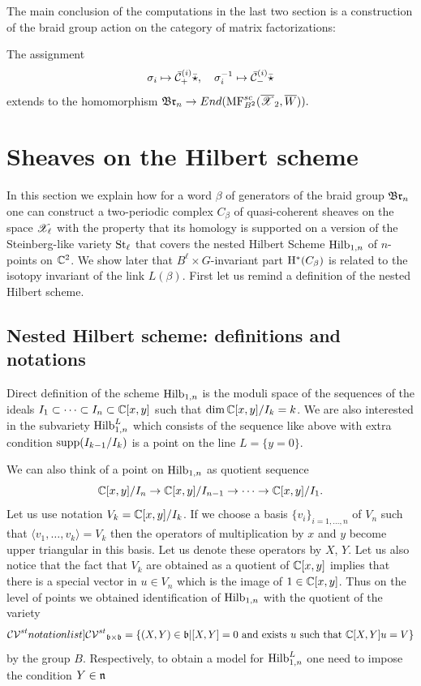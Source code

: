The main conclusion of the computations in the last two section is a construction of the braid group  action on the category of matrix factorizations:
\begin{corollary} The assignment
  \[\sigma_i\mapsto \bar{\mathcal{C}}^{(i)}_+\bar{\star},\quad \sigma_{i}^{-1}\mapsto \bar{\mathcal{C}}^{(i)}_-\bar{\star} \]
  extends to the homomorphism \(\mathfrak{Br}_n\to End(\mathrm{MF}^{sc}_{B^2}(\overline{\mathscr{X}}_2,\overline{W})).\)
\end{corollary}


\section{Sheaves on the Hilbert scheme}\label{sec: link inv}
In this section we explain how for a word $\beta$ of generators of the braid group $ \mathfrak{Br}_n$ one can construct a two-periodic complex $C_\beta$ of quasi-coherent sheaves on the space $\mathscr{X}_\ell$ with the property that
its homology is supported on
a version of the Steinberg-like
variety $\mathrm{St}_\ell$ that covers  the nested Hilbert Scheme $\mathrm{Hilb}_{1,n}$ of $n$-points on $\mathbb{C}^2$.
We show later  that $B^\ell\times G$-invariant part $\mathrm{H}^{*}(C_\beta)$ is related to the isotopy   invariant of the link $L(\beta)$. First let us remind a definition of the nested Hilbert scheme.

\subsection{Nested Hilbert scheme: definitions and notations}\label{ssec: NHilb defs} Direct definition of the scheme $\mathrm{Hilb}_{1,n}$ is the moduli space of the sequences of the ideals $I_1\subset\dots\subset I_n\subset \mathbb{C}[x,y]$ such that $\dim \mathbb{C}[x,y]/I_k=k$.
We are also interested in the subvariety $\mathrm{Hilb}_{1,n}^L$ which consists of the sequence like above with extra condition $\mathrm{supp}(I_{k-1}/I_k)$ is a point on the line $L=\{ y=0\}$.


We can also think of a point on $\mathrm{Hilb}_{1,n}$ as  quotient sequence \[\mathbb{C}[x,y]/I_n\to\mathbb{C}[x,y]/I_{n-1}\to\dots\to \mathbb{C}[x,y]/I_1.\]
Let us use notation $V_k=\mathbb{C}[x,y]/I_k$.
If we choose a basis $\{v_i\}_{i=1,\dots,n}$ of $V_n$ such that $\langle v_1,\dots,v_k\rangle=V_k$ then the operators of multiplication by $x$ and $y$ become upper triangular in this basis.
Let us denote these operators by $X$, $Y$. Let us also notice that the fact that $V_k$ are obtained as a quotient of $\mathbb{C}[x,y]$ implies that there is a special vector in $u\in V_n$ which is the image of
$1\in \mathbb{C}[x,y]$. Thus on the level of points we obtained identification of $\mathrm{Hilb}_{1,n}$ with the quotient of the variety
$$\SymbolPrint{ \mathcal{CV}^{st}}_{\frb\times\frb}=\{(X,Y)\in \frb| [X,Y]=0 \mbox{ and exists } u \mbox{ such that } \CC[X,Y] u=V\}$$
by the group $B$. Respectively, to obtain a model for $\mathrm{Hilb}_{1,n}^L$ one need to impose the condition $Y\in \mathfrak{n}$

